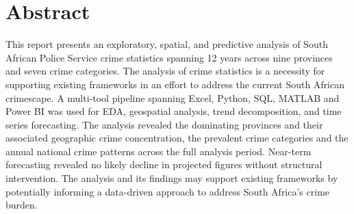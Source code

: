 \documentclass[titlepage, 12pt, oneside]{article}
\numberwithin{equation}{section}
\begin{document}
	
	\newpage
	
	\section*{Abstract}
	
	This report presents an exploratory, spatial, and predictive analysis of South African Police Service crime statistics spanning 12 years across nine provinces and seven crime categories. The analysis of crime statistics is a necessity for supporting existing frameworks in an effort to address the current South African crimescape. A multi-tool pipeline spanning Excel, Python, SQL, MATLAB and Power BI was used for EDA, geospatial analysis, trend decomposition, and time series forecasting. The analysis revealed the dominating provinces and their associated geographic crime concentration, the prevalent crime categories and the annual national crime patterns across the full analysis period. Near-term forecasting revealed no likely decline in projected figures without structural intervention. The analysis and its findings may support existing frameworks by potentially informing a data-driven approach to address South Africa's crime burden.  
	
	\newpage
	
	\tableofcontents
	
	\newpage
	
	\listoffigures
	
	\newpage
	
	
	\newpage
\end{document}
